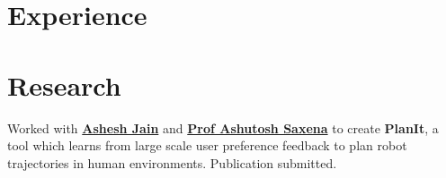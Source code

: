 \documentclass[]{deedy-resume-openfont}
\begin{document}
\begin{minipage}[t]{0.66\textwidth} 


\section{Experience}

\vspace{\topsep} %
\begin{tightemize}
	\item 
	\item
	
\end{tightemize}
\sectionsep

\begin{tightemize}
	\item 
	\item 
	\item 
\end{tightemize}
\begin{tightemize}
	\item 
	\item 
	\item 
\end{tightemize}
\begin{tightemize}
	\item 
	\item 
	\item 
\end{tightemize}
\sectionsep


\section{Research}
Worked with \textbf{\href{http://www.cs.cornell.edu/~ashesh/}{Ashesh Jain}} and \textbf{\href{http://www.cs.cornell.edu/~asaxena/}{Prof Ashutosh Saxena}} to create \textbf{PlanIt}, a tool which  learns from large scale user preference feedback to plan robot trajectories in human environments.  Publication submitted.
\sectionsep


\end{minipage}
\end{document}
